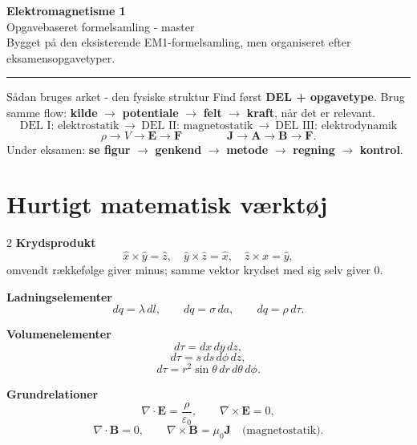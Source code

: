\documentclass[10pt,a4paper]{article}
\newcommand{\epsz}{\varepsilon_0}
\begin{document}
\begin{center}
{\LARGE\bfseries Elektromagnetisme 1}\\[1mm]
{\large Opgavebaseret formelsamling - master}\\[2mm]
\small Bygget på den eksisterende EM1-formelsamling, men organiseret efter eksamensopgavetyper.\\
\end{center}
\vspace{-2mm}
\hrule
\vspace{2mm}

\begin{quickbox}{Sådan bruges arket - den fysiske struktur}
Find først \textbf{DEL + opgavetype}. Brug samme flow: \textbf{kilde} $\to$ \textbf{potentiale} $\to$ \textbf{felt} $\to$ \textbf{kraft}, når det er relevant.
\[
\boxed{\text{DEL I: elektrostatik}}\ \longrightarrow\
\boxed{\text{DEL II: magnetostatik}}\ \longrightarrow\
\boxed{\text{DEL III: elektrodynamik}}
\]
\[
\boxed{\rho\to V\to\mathbf E\to\mathbf F}
\qquad\qquad
\boxed{\mathbf J\to\mathbf A\to\mathbf B\to\mathbf F}.
\]
Under eksamen: \textbf{se figur} $\to$ \textbf{genkend} $\to$ \textbf{metode} $\to$ \textbf{regning} $\to$ \textbf{kontrol}.
\end{quickbox}

\tableofcontents
\newpage

\section{Hurtigt matematisk værktøj}
\begin{multicols}{2}
\textbf{Krydsprodukt}
\[
\hat x\times\hat y=\hat z,\quad \hat y\times\hat z=\hat x,\quad \hat z\times\hat x=\hat y,
\]
omvendt rækkefølge giver minus; samme vektor krydset med sig selv giver 0.

\textbf{Ladningselementer}
\[
dq=\lambda\,dl,\qquad dq=\sigma\,da,\qquad dq=\rho\,d\tau.
\]

\textbf{Volumenelementer}
\[
d\tau=dx\,dy\,dz,
\]
\[
d\tau=s\,ds\,d\phi\,dz,
\]
\[
d\tau=r^2\sin\theta\,dr\,d\theta\,d\phi.
\]

\textbf{Grundrelationer}
\[
\nabla\cdot\mathbf E=\frac{\rho}{\epsz},\qquad \nabla\times\mathbf E=0,
\]
\[
\nabla\cdot\mathbf B=0,\qquad \nabla\times\mathbf B=\mu_0\mathbf J\quad\text{(magnetostatik)}.
\]
\end{multicols}
\end{document}
